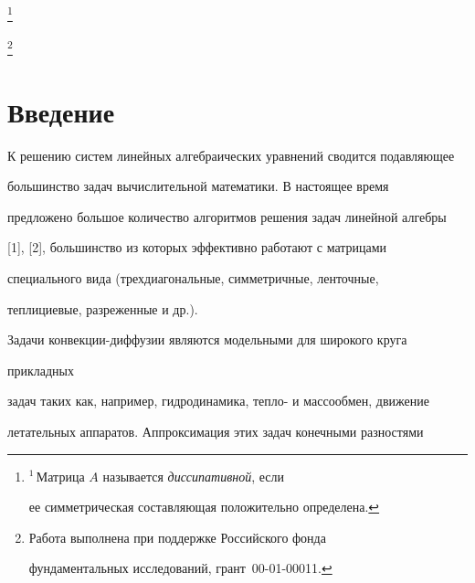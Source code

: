 \thanks{$^1$\,Матрица $A$ называется {\it диссипативной}, если 


ее симметрическая составляющая положительно определена.}


\thanks{Работа выполнена при поддержке Российского фонда 


фундаментальных исследований, грант \No\,00-01-00011.} 


 


\date{} 




\pagestyle{plain} %


 




\maketitle 


\label{begin} 


 


\section{Введение} 


 


К решению систем линейных алгебраических уравнений сводится подавляющее 


большинство задач вычислительной математики. В настоящее время 


предложено большое количество алгоритмов решения задач линейной алгебры 


[1], [2], большинство из которых эффективно работают с матрицами 


специального вида (трехдиагональные, симметричные, ленточные, 


теплициевые, разреженные и др.). 


 


Задачи конвекции-диффузии являются модельными для широкого круга 


прикладных 


задач таких как, например, гидродинамика, тепло- и массообмен, движение 


летательных аппаратов. Аппроксимация этих задач конечными разностями 


